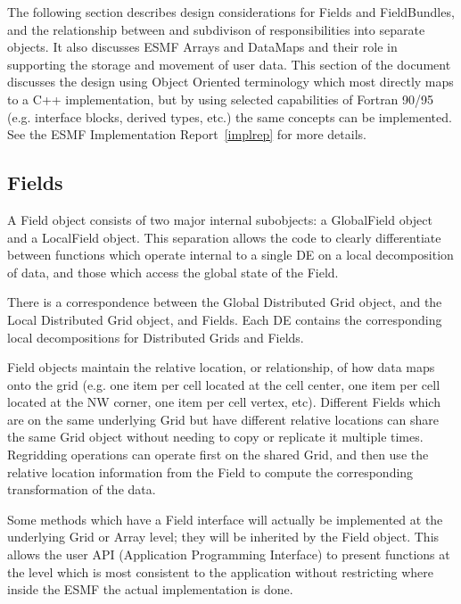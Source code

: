 

The following section describes design considerations for
Fields and FieldBundles, and the relationship between and subdivison of
responsibilities into separate objects.
It also discusses ESMF Arrays and DataMaps and their
role in supporting the storage and movement of user data.
This section of the document discusses the design using 
Object Oriented terminology which most directly maps 
to a C++ implementation, but by using selected
capabilities of Fortran 90/95 (e.g. interface blocks,
derived types, etc.) the same concepts can be implemented.
See the ESMF Implementation Report~\ref{implrep} for more details.

\subsection{Fields}

A Field object consists of two major internal subobjects: a GlobalField object
and a LocalField object.  This separation allows the code to clearly
differentiate between functions which operate internal to a single DE
on a local decomposition of data, 
and those which access the global state of the Field.  
 
There is a correspondence between the Global Distributed Grid object,
and the Local Distributed Grid object, and Fields.  Each DE contains
the corresponding local decompositions for Distributed Grids and Fields.

Field objects maintain the relative location, or relationship, of
how data maps onto the grid (e.g. one item per cell located at
the cell center, one item per cell located at the NW corner, 
one item per cell vertex, etc).  Different Fields
which are on the same underlying Grid but have different
relative locations
can share the same Grid object without
needing to copy or replicate it multiple times.  Regridding
operations can operate first on the shared Grid, and then
use the relative location information from the Field to compute the
corresponding transformation of the data.

Some methods which have a Field interface will actually be
implemented at the underlying Grid or Array level; they
will be inherited by the Field object.  This allows the user
API (Application Programming Interface) to present functions at
the level which is most consistent to the application without
restricting where inside the ESMF the actual implementation
is done.

